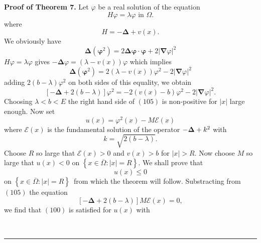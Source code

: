 \documentclass{article}
\newenvironment{proof}[1][Proof]{\noindent\textbf{#1.} }{\ \rule{0.5em}{0.5em}}
\begin{document}
\begin{proof}[Proof of Theorem 7]
Let $\varphi $ be a real solution of the equation 
\begin{equation}
H\varphi =\lambda \varphi \text{ \ \ \ in }\Omega .
\end{equation}%
where 
\begin{equation*}
H=-\mathbf{\Delta }+v(x).
\end{equation*}%
We obviously have\ 
\begin{equation}
\mathbf{\Delta }\left( \mathbf{\varphi }^{2}\right) =2\mathbf{\Delta \varphi
\cdot \varphi +}2\left| \mathbf{\nabla }\varphi \right| ^{2}
\end{equation}%
$H\varphi =\lambda \varphi $ gives $-\mathbf{\Delta }\varphi =\left( \lambda
-v(x)\right) \varphi $ which implies 
\begin{equation}
\mathbf{\Delta }\left( \mathbf{\varphi }^{2}\right) =2\left( \lambda
-v(x)\right) \varphi ^{2}-2\left| \mathbf{\nabla }\varphi \right| ^{2}
\end{equation}%
adding $2(b-\lambda )\varphi ^{2}$ on both sides of this equality, we obtain 
\begin{equation}
\left[ -\mathbf{\Delta +}2(b-\lambda )\right] \varphi ^{2}=-2\left(
v(x)-b\right) \varphi ^{2}-2\left| \mathbf{\nabla }\varphi \right| ^{2}.
\end{equation}%
Choosing $\lambda <b<E$ the right hand side of $(105)$ is non-positive for $%
\left| x\right| $ large enough.  Now set 
\begin{equation}
u(x)=\varphi ^{2}(x)-M\mathcal{E}(x)
\end{equation}%
where $\mathcal{E}(x)$ is the fundamental solution of the operator $-\mathbf{%
\Delta }+k^{2}$ with%
\begin{equation}
k=\sqrt{2(b-\lambda )}.
\end{equation}%
Choose $R$ so large that $\mathcal{E}(x)>0$ and $v(x)>b$ for $\left|
x\right| >R.$ Now choose $M$ so large that $u(x)<0$ on $\left\{ x\in 
\overline{\Omega }:\left| x\right| =R\right\} .$ We shall prove that 
\begin{equation}
u(x)\leq 0
\end{equation}%
on $\left\{ x\in \overline{\Omega }:\left| x\right| =R\right\} $\ from which
the theorem will follow.  Substracting from $(105)$ the equation 
\begin{equation}
\left[ -\mathbf{\Delta +}2(b-\lambda )\right] M\mathcal{E}(x)=0,
\end{equation}%
we find that $(100)$ is satisfied for $u(x)$ with%

\end{proof}
\end{document}
